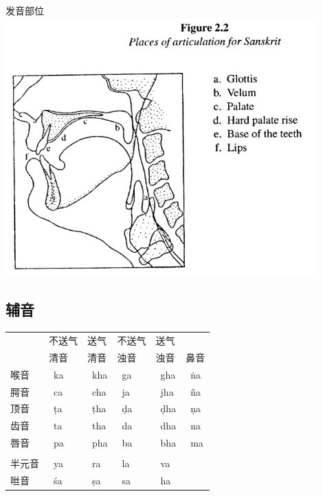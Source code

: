 \documentclass[17pt]{beamer}
\newcommand{\skt}[1]{{\sanskritfont{#1}}} %
\newcommand{\skttrans}[1]{{\skt{#1}~#1}}  %
\begin{document}
\begin{frame}{发音部位}
    \centering    
    \includegraphics[width=0.9\textwidth]{placeofarticulation.png}
\end{frame}

\subsection{辅音}

\begin{frame}{\insertsubsection }
  \small
  \begin{tabular}{@{}llllll@{}} %
     & 不送气  & 送气 & 不送气 & 送气 &   \\
     & 清音  & 清音 & 浊音 & 浊音 & 鼻音  \\
    喉音  & \skttrans{ka}  & \skttrans{kha} & \skttrans{ga} & \skttrans{gha} & \skttrans{ṅa} \\
    腭音  & \skttrans{ca}  & \skttrans{cha} & \skttrans{ja} & \skttrans{jha} & \skttrans{ña} \\
    顶音  & \skttrans{ṭa}  & \skttrans{ṭha} & \skttrans{ḍa} & \skttrans{ḍha} & \skttrans{ṇa} \\
    齿音  & \skttrans{ta}  & \skttrans{tha} & \skttrans{da} & \skttrans{dha} & \skttrans{na} \\
    唇音  & \skttrans{pa}  & \skttrans{pha} & \skttrans{ba} & \skttrans{bha} & \skttrans{ma} \\
      &  & &  & &   \\
    半元音  & \skttrans{ya}  & \skttrans{ra} & \skttrans{la} & \skttrans{va} &  \\
    咝音  & \skttrans{śa}  & \skttrans{ṣa} & \skttrans{sa} &  \skttrans{ha} & \\
  \end{tabular}
\end{frame}
\end{document}
